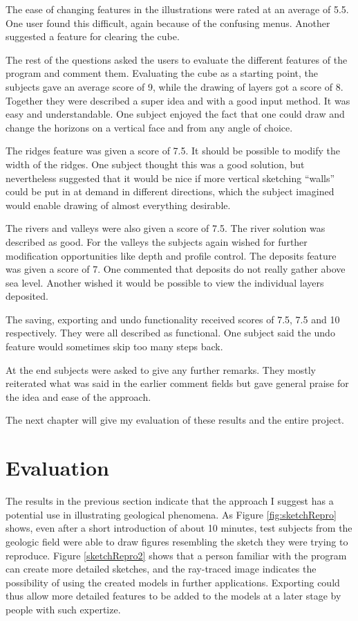 \documentclass[a4paper,12pt]{report}
\begin{document}
The ease of changing features in the illustrations were rated at an average of 5.5. One user found this difficult, again because of the confusing menus. Another suggested a feature for clearing the cube.

The rest of the questions asked the users to evaluate the different features of the program and comment them. Evaluating the cube as a starting point, the subjects gave an average score of 9, while the drawing of layers got a score of 8. Together they were described a super idea and with a good input method. It was easy and understandable. One subject enjoyed the fact that one could draw and change the horizons on a vertical face and from any angle of choice.

The ridges feature was given a score of 7.5. It should be possible to modify the width of the ridges. One subject thought this was a good solution, but nevertheless suggested that it would be nice if more vertical sketching ``walls'' could be put in at demand in different directions, which the subject imagined would enable drawing of almost everything desirable.

The rivers and valleys were also given a score of 7.5. The river solution was described as good. For the valleys the subjects again wished for further modification opportunities like depth and profile control. The deposits feature was given a score of 7. One commented that deposits do not really gather above sea level. Another wished it would be possible to view the individual layers deposited.

The saving, exporting and undo functionality received scores of 7.5, 7.5 and 10 respectively. They were all described as functional. One subject said the undo feature would sometimes skip too many steps back.

At the end subjects were asked to give any further remarks. They mostly reiterated what was said in the earlier comment fields but gave general praise for the idea and ease of the approach.

The next chapter will give my evaluation of these results and the entire project.

\clearpage
\chapter{Evaluation}
\label{sec:eval}
The results in the previous section indicate that the approach I suggest has a potential use in illustrating geological phenomena. As Figure \ref{fig:sketchRepro} shows, even after a short introduction of about 10 minutes, test subjects from the geologic field were able to draw figures resembling the sketch they were trying to reproduce. Figure \ref{sketchRepro2} shows that a person familiar with the program can create more detailed sketches, and the ray-traced image indicates the possibility of using the created models in further applications. Exporting could thus allow more detailed features to be added to the models at a later stage by people with such expertize.
\end{document}
